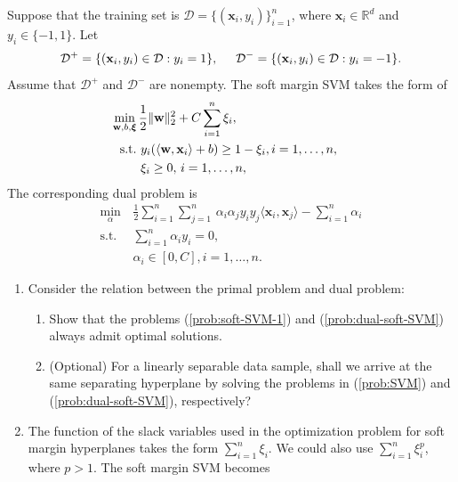 \documentclass[11pt,letter,notitlepage]{article}
\begin{document}
\newpage
\begin{exercise}
Suppose that the training set is $\mathcal{D}=\{ (\textbf{x}_i,y_i) \}_{i=1}^n$, where $\textbf{x}_i \in \mathbb{R}^d$ and $y_i \in \{ -1,1 \}$. Let
\begin{align*}
    \mathcal{D}^+=\{(\textbf{x}_i,y_i)\in\mathcal{D}:y_i=1\},\hspace{5mm}\mathcal{D}^-=\{(\textbf{x}_i,y_i)\in\mathcal{D}:y_i=-1\}.
\end{align*}
Assume that $\mathcal{D}^+$ and $\mathcal{D}^-$ are nonempty.
The soft margin SVM takes the form of
\begin{align}\label{prob:soft-SVM-1}
    \min_{\mathbf{w},b,\boldsymbol{\xi}}\,&\frac{1}{2}\|\mathbf{w}\|^2_2+C\sum_{i=1}^n\xi_i,\\ \nonumber
    {\rm s.t.\,}&\,y_i(\langle\mathbf{w},\mathbf{x}_i\rangle+b)\geq1-\xi_i,i=1,\ldots,n,&\\ \nonumber
    &\,\xi_i\geq0,\,i=1,\ldots,n,
\end{align}
The corresponding dual problem is
\begin{align}\label{prob:dual-soft-SVM}
		\min_{\alpha}\,&\frac{1}{2}\sum_{i=1}^n\sum_{j=1}^n\,\alpha_i\alpha_jy_iy_j\langle\mathbf{x}_i,\mathbf{x}_j\rangle-\sum_{i=1}^n\alpha_i\\\nonumber
	\mbox{s.t. }\,&\sum_{i=1}^n\alpha_iy_i=0,\\\nonumber
	&\alpha_i\in[0,C],i=1,\ldots,n.
\end{align}
\begin{enumerate}
    \item Consider the relation between the primal problem and dual problem:
    \begin{enumerate}
        \item Show that the problems (\ref{prob:soft-SVM-1}) and (\ref{prob:dual-soft-SVM}) always admit optimal solutions.
        \item (Optional) For a linearly separable data sample, shall we arrive at the same separating hyperplane by solving the problems in (\ref{prob:SVM})  and (\ref{prob:dual-soft-SVM}), respectively?
    \end{enumerate}
    \item The function of the slack variables used in the optimization problem for soft margin hyperplanes takes the form $\sum_{i=1}^n \xi_i$. We could also use $\sum_{i=1}^n \xi_i^p$, where $p>1$. The soft margin SVM becomes
    \begin{align}\label{prob:soft-SVM-p}

\end{align}
\end{enumerate}
\end{exercise}
\end{document}

